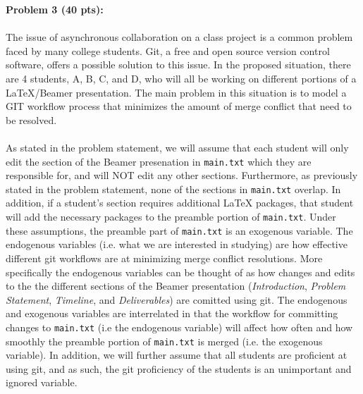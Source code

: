 \documentclass[12pt]{article}
\begin{document}
\newpage
\noindent\textbf{Problem 3 (40 pts):}

\paragraph{} The issue of asynchronous collaboration on a class project is a common problem faced by many college students. Git, a free and open source version control software, offers a possible solution to this issue. In the proposed situation, there are 4 students, A, B, C, and D, who will all be working on different portions of a LaTeX/Beamer presentation. The main problem in this situation is to model a GIT workflow process that minimizes the amount of merge conflict that need to be resolved. 

\paragraph{} As stated in the problem statement, we will assume that each student will only edit the section of the Beamer presenation in \texttt{main.txt} which they are responsible for, and will NOT edit any other sections. Furthermore, as previously stated in the problem statement, none of the sections in \texttt{main.txt} overlap. In addition, if a student's section requires additional LaTeX packages, that student will add the necessary packages to the preamble portion of \texttt{main.txt}. Under these assumptions, the preamble part of \texttt{main.txt} is an exogenous variable. The endogenous variables (i.e. what we are interested in studying) are how effective different git workflows are at minimizing merge conflict resolutions. More specifically the endogenous variables can be thought of as how changes and edits to the the different sections of the Beamer presentation (\emph{Introduction}, \emph{Problem Statement}, \emph{Timeline}, and \emph{Deliverables}) are comitted using git. The endogenous and exogenous variables are interrelated in that the workflow for committing changes to \texttt{main.txt} (i.e the endogenous variable) will affect how often and how smoothly the preamble portion of \texttt{main.txt} is merged (i.e. the exogenous variable). In addition, we will further assume that all students are proficient at using git, and as such, the git proficiency of the students is an unimportant and ignored variable.
\end{document}
